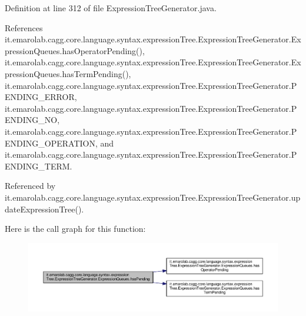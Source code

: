 Definition at line 312 of file Expression\-Tree\-Generator.\-java.



References it.\-emarolab.\-cagg.\-core.\-language.\-syntax.\-expression\-Tree.\-Expression\-Tree\-Generator.\-Expression\-Queues.\-has\-Operator\-Pending(), it.\-emarolab.\-cagg.\-core.\-language.\-syntax.\-expression\-Tree.\-Expression\-Tree\-Generator.\-Expression\-Queues.\-has\-Term\-Pending(), it.\-emarolab.\-cagg.\-core.\-language.\-syntax.\-expression\-Tree.\-Expression\-Tree\-Generator.\-P\-E\-N\-D\-I\-N\-G\-\_\-\-E\-R\-R\-O\-R, it.\-emarolab.\-cagg.\-core.\-language.\-syntax.\-expression\-Tree.\-Expression\-Tree\-Generator.\-P\-E\-N\-D\-I\-N\-G\-\_\-\-N\-O, it.\-emarolab.\-cagg.\-core.\-language.\-syntax.\-expression\-Tree.\-Expression\-Tree\-Generator.\-P\-E\-N\-D\-I\-N\-G\-\_\-\-O\-P\-E\-R\-A\-T\-I\-O\-N, and it.\-emarolab.\-cagg.\-core.\-language.\-syntax.\-expression\-Tree.\-Expression\-Tree\-Generator.\-P\-E\-N\-D\-I\-N\-G\-\_\-\-T\-E\-R\-M.



Referenced by it.\-emarolab.\-cagg.\-core.\-language.\-syntax.\-expression\-Tree.\-Expression\-Tree\-Generator.\-update\-Expression\-Tree().



Here is the call graph for this function\-:\nopagebreak
\begin{figure}[H]
\begin{center}
\leavevmode
\includegraphics[width=350pt]{classit_1_1emarolab_1_1cagg_1_1core_1_1language_1_1syntax_1_1expressionTree_1_1ExpressionTreeGenerator_1_1ExpressionQueues_a3e49595a6682e2ca900f3813c126483d_cgraph}
\end{center}
\end{figure}


